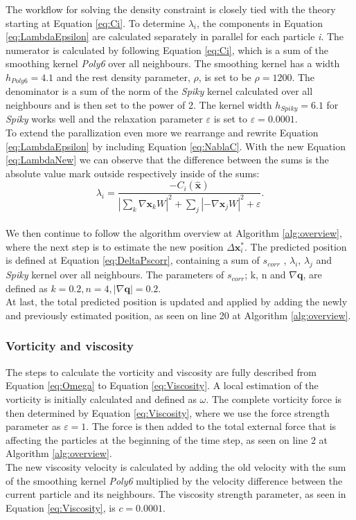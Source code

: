 The workflow for solving the density constraint is closely tied with the theory starting at Equation \ref{eq:Ci}. 
To determine $\lambda_{i}$, the components in Equation \ref{eq:LambdaEpsilon} are calculated separately in parallel 
for each particle \textit{i}.
The numerator is calculated by following Equation \ref{eq:Ci}, which is a sum of the smoothing kernel \textit{Poly6} over 
all neighbours. The smoothing kernel has a width $h_{Poly6} = 4.1$ and the rest density parameter, $\rho$, is set to be $\rho = 1200$. 
The denominator is a sum of the norm of the \textit{Spiky} kernel calculated over all neighbours 
and is then set to the power of 2. The kernel width $h_{Spiky} = 6.1$ for \textit{Spiky} works well and the 
relaxation parameter $\varepsilon$ is set to $\varepsilon = 0.0001$.
\\
\newline
To extend the parallization even more we rearrange and rewrite Equation \ref{eq:LambdaEpsilon} by including Equation \ref{eq:NablaC}. With the 
new Equation \ref{eq:LambdaNew} we can observe that the difference between the sums is the absolute value mark 
outside respectively inside of the sums: 
\\
\begin{equation}
\label{eq:LambdaNew}
\lambda_i = \frac{- C_i(\hat{\mathbf{x}}) }{ |\sum\limits_{k} \nabla \mathbf{x}_k W|^{2} + \sum\limits_{j} |-\nabla \mathbf{x}_j W|^2  + \varepsilon}.
\end{equation}
\\
\newline
We then continue to follow the algorithm overview at Algorithm \ref{alg:overview}, where the next step is to estimate the new position $\Delta \mathbf{x}^{*}_{i}$.
The predicted position is defined at Equation \ref{eq:DeltaPscorr}, containing a sum of $s_{corr}$ , $\lambda_{i}$, $\lambda_{j}$ 
and \textit{Spiky} kernel over all neighbours. 
The parameters of $s_{corr}$; k, n and $ \nabla \mathbf{q}$, are defined as $k = 0.2, n = 4, |\nabla \mathbf{q}| = 0.2$. 
\\
At last, the total predicted position is updated and applied by adding the newly and previously estimated position, 
as seen on line 20 at Algorithm \ref{alg:overview}.

\subsubsection{Vorticity and viscosity}
The steps to calculate the vorticity and viscosity are fully described from Equation \ref{eq:Omega} to Equation \ref{eq:Viscosity}.
A local estimation of the vorticity is initially calculated and defined as $\omega$. The complete vorticity force is then determined 
by Equation \ref{eq:Viscosity}, where we use the force strength parameter as $\varepsilon = 1$. The force is then added to the total 
external force that is affecting the particles at the beginning of the time step, as seen on line 2 at Algorithm \ref{alg:overview}. 
\\
The new viscosity velocity is calculated by adding the old velocity with the sum of the smoothing kernel \textit{Poly6} multiplied by the velocity difference between 
the current particle and its neighbours. The viscosity strength parameter, as seen in Equation \ref{eq:Viscosity}, is $c = 0.0001$. 